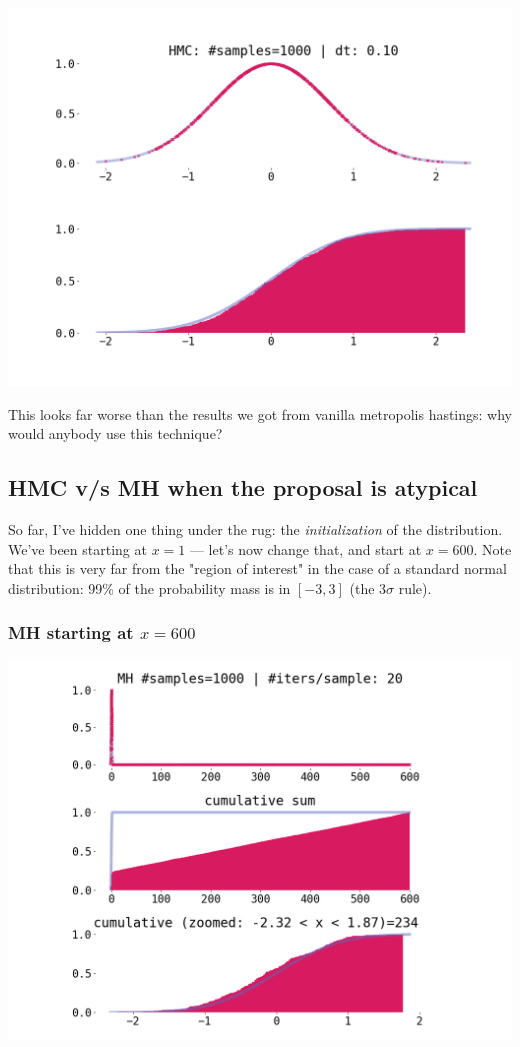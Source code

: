 \documentclass[titlepage]{article}
\begin{document}
\includegraphics[width=\textwidth]{mcmc-hmc-1d-exp.png}

This looks far worse than the results we got from vanilla metropolis hastings:
why would anybody use this technique?


\subsection{HMC v/s MH when the proposal is atypical}

So far, I've hidden one thing under the rug: the \emph{initialization} of
the distribution. We've been starting at $x = 1$ --- let's now change that,
and start at $x = 600$. Note that this is very far from the "region of
interest" in the case of a standard normal distribution: 99\% of the probability
mass is in $[-3, 3]$ (the $3 \sigma$ rule).

\subsubsection{MH starting at $x = 600$}

\includegraphics[width=\textwidth]{mcmc-mh-uncorr-1d-exp-startx-600.png}
\end{document}
